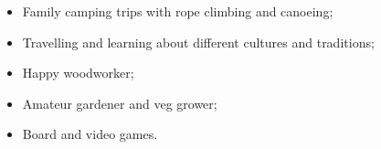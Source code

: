 \documentclass[10pt,a4paper,ragged2e,withhyper]{altacv}
\begin{document}
\begin{paracol}{2}


\divider



\begin{itemize}
    \item Family camping trips with rope climbing and canoeing;
    
    \item Travelling and learning about different cultures and traditions;

    \item Happy woodworker;

    \item Amateur gardener and veg grower;

    \item Board and video games.
\end{itemize}


\end{paracol}

\end{document}
